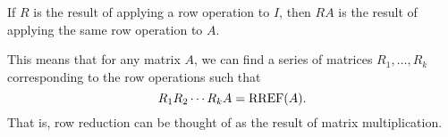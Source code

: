 \begin{applicationActivities}
\begin{fact}
If \(R\) is the result of applying a row operation to \(I\), then
\(RA\) is the result of applying the same row operation to \(A\).

This means that for any matrix $A$, we can find a series of matrices $R_1, \ldots, R_k$ corresponding to the row operations such that $$R_1 R_2 \cdots R_k A = \operatorname{RREF}(A).$$ That is, row reduction can be thought of as the result
of matrix multiplication.
\end{fact}






\end{applicationActivities}
